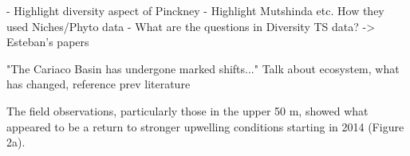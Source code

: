     - Highlight diversity aspect of Pinckney
    - Highlight Mutshinda etc. How they used Niches/Phyto data
    - What are the questions in Diversity TS data? -> Esteban's papers
   

    
    
    "The Cariaco Basin has undergone marked shifts..." Talk about ecosystem, what has changed, reference prev literature

        The field observations, particularly those in the upper 50 m, showed what appeared to be a return to stronger upwelling conditions starting in 2014 (Figure 2a).


